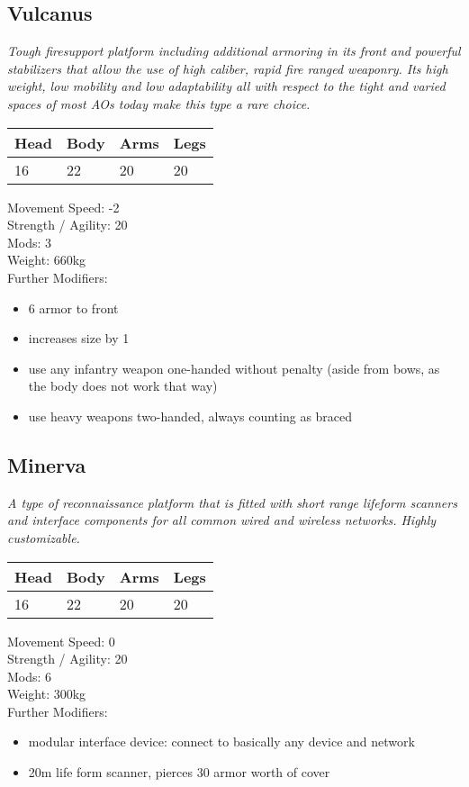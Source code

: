 \documentclass[12pt,a4paper,openany]{book}
\begin{document}
	\subsection{Vulcanus}
	\textit{Tough firesupport platform including additional armoring in its front and powerful stabilizers that allow the use of high caliber, rapid fire ranged weaponry. Its high weight, low mobility and low adaptability all with respect to the tight and varied spaces of most AOs today make this type a rare choice.}\par
	\begin{tabular}{|l|l|l|l|}
		\hline
		Head & Body & Arms & Legs\\
		\hline
		16 & 22 & 20 & 20\\
		\hline
	\end{tabular}
	\par
	Movement Speed: -2\\
	Strength / Agility: 20\\
	Mods: 3\\
	Weight: 660kg\\
	Further Modifiers:
	\vspace{-8mm}
	\begin{itemize}
		\setlength\itemsep{-8mm}
		\item 6 armor to front
		\item increases size by 1
		\item use any infantry weapon one-handed without penalty (aside from bows, as the body does not work that way)
		\item use heavy weapons two-handed, always counting as braced
	\end{itemize}
	\par
	\subsection{Minerva}
	\textit{A type of reconnaissance platform that is fitted with short range lifeform scanners and interface components for all common wired and wireless networks. Highly customizable.}\par
	\begin{tabular}{|l|l|l|l|}
		\hline
		Head & Body & Arms & Legs\\
		\hline
		16 & 22 & 20 & 20\\
		\hline
	\end{tabular}
	\par
	Movement Speed: 0\\
	Strength / Agility: 20\\
	Mods: 6\\
	Weight: 300kg\\
	Further Modifiers:
	\vspace{-8mm}
	\begin{itemize}
		\setlength\itemsep{-8mm}
		\item modular interface device: connect to basically any device and network
		\item 20m life form scanner, pierces 30 armor worth of cover
	\end{itemize}
	\par
\end{document}
